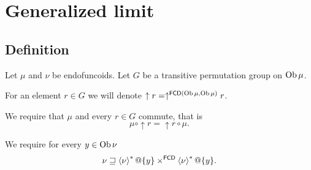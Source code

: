 \section{Generalized limit}

\subsection{Definition}

Let $\mu$ and $\nu$ be endofuncoids. Let $G$ be a transitive permutation
group on $\operatorname{Ob}\mu$.

For an element $r\in G$ we will denote $\uparrow r=\uparrow^{\mathsf{FCD}(\operatorname{Ob}\mu,\operatorname{Ob}\mu)}r$.

We require that $\mu$ and every $r\in G$ commute, that is
\[
\mu\circ\uparrow r=\uparrow r\circ\mu.
\]


We require for every $y\in\operatorname{Ob}\nu$ 
\begin{equation}
\nu\sqsupseteq\left\langle \nu\right\rangle ^{\ast}@\{y\}\times^{\mathsf{FCD}}\left\langle \nu\right\rangle ^{\ast}@\{y\}.\label{lim-squares}
\end{equation}

